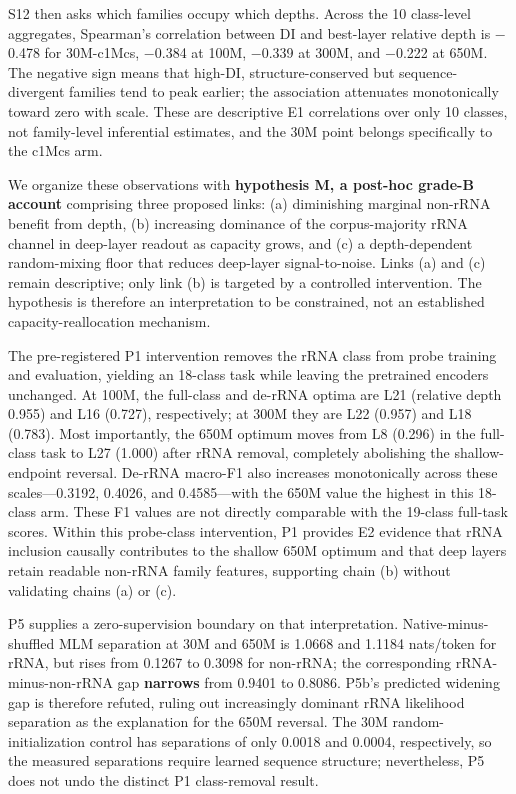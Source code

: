 S12 then asks which families occupy which depths. Across the 10 class-level aggregates, Spearman's correlation between DI and best-layer relative depth is \(-\)0.478 for 30M-c1Mcs, \(-\)0.384 at 100M, \(-\)0.339 at 300M, and \(-\)0.222 at 650M. The negative sign means that high-DI, structure-conserved but sequence-divergent families tend to peak earlier; the association attenuates monotonically toward zero with scale. These are descriptive E1 correlations over only 10 classes, not family-level inferential estimates, and the 30M point belongs specifically to the c1Mcs arm.

We organize these observations with \textbf{hypothesis M, a post-hoc grade-B account} comprising three proposed links: (a) diminishing marginal non-rRNA benefit from depth, (b) increasing dominance of the corpus-majority rRNA channel in deep-layer readout as capacity grows, and (c) a depth-dependent random-mixing floor that reduces deep-layer signal-to-noise. Links (a) and (c) remain descriptive; only link (b) is targeted by a controlled intervention. The hypothesis is therefore an interpretation to be constrained, not an established capacity-reallocation mechanism.

The pre-registered P1 intervention removes the rRNA class from probe training and evaluation, yielding an 18-class task while leaving the pretrained encoders unchanged. At 100M, the full-class and de-rRNA optima are L21 (relative depth 0.955) and L16 (0.727), respectively; at 300M they are L22 (0.957) and L18 (0.783). Most importantly, the 650M optimum moves from L8 (0.296) in the full-class task to L27 (1.000) after rRNA removal, completely abolishing the shallow-endpoint reversal. De-rRNA macro-F1 also increases monotonically across these scales---0.3192, 0.4026, and 0.4585---with the 650M value the highest in this 18-class arm. These F1 values are not directly comparable with the 19-class full-task scores. Within this probe-class intervention, P1 provides E2 evidence that rRNA inclusion causally contributes to the shallow 650M optimum and that deep layers retain readable non-rRNA family features, supporting chain (b) without validating chains (a) or (c).

P5 supplies a zero-supervision boundary on that interpretation. Native-minus-shuffled MLM separation at 30M and 650M is 1.0668 and 1.1184 nats/token for rRNA, but rises from 0.1267 to 0.3098 for non-rRNA; the corresponding rRNA-minus-non-rRNA gap \textbf{narrows} from 0.9401 to 0.8086. P5b's predicted widening gap is therefore refuted, ruling out increasingly dominant rRNA likelihood separation as the explanation for the 650M reversal. The 30M random-initialization control has separations of only 0.0018 and 0.0004, respectively, so the measured separations require learned sequence structure; nevertheless, P5 does not undo the distinct P1 class-removal result.

